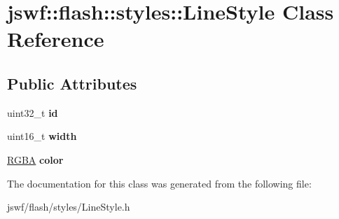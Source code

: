 \hypertarget{classjswf_1_1flash_1_1styles_1_1_line_style}{\section{jswf\+:\+:flash\+:\+:styles\+:\+:Line\+Style Class Reference}
\label{classjswf_1_1flash_1_1styles_1_1_line_style}
}
\subsection*{Public Attributes}
\begin{DoxyCompactItemize}
\item 
\hypertarget{classjswf_1_1flash_1_1styles_1_1_line_style_a4812ec865db585131d277d959aed49d3}{uint32\+\_\+t {\bfseries id}}\label{classjswf_1_1flash_1_1styles_1_1_line_style_a4812ec865db585131d277d959aed49d3}

\item 
\hypertarget{classjswf_1_1flash_1_1styles_1_1_line_style_ae981bc9ccf17f98db10ced8846fed022}{uint16\+\_\+t {\bfseries width}}\label{classjswf_1_1flash_1_1styles_1_1_line_style_ae981bc9ccf17f98db10ced8846fed022}

\item 
\hypertarget{classjswf_1_1flash_1_1styles_1_1_line_style_ae4ec4dd5acb2e8730817ac443c76c2ad}{\hyperlink{structjswf_1_1flash_1_1_r_g_b_a}{R\+G\+B\+A} {\bfseries color}}\label{classjswf_1_1flash_1_1styles_1_1_line_style_ae4ec4dd5acb2e8730817ac443c76c2ad}

\end{DoxyCompactItemize}


The documentation for this class was generated from the following file\+:\begin{DoxyCompactItemize}
\item 
jswf/flash/styles/Line\+Style.\+h\end{DoxyCompactItemize}
